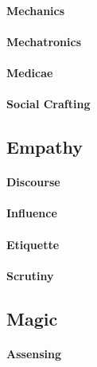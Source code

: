 \paragraph{Mechanics}

\paragraph{Mechatronics}

\paragraph{Medicae}

\paragraph{Social Crafting}


\subsection{Empathy}

\paragraph{Discourse}

\paragraph{Influence}

\paragraph{Etiquette}

\paragraph{Scrutiny}


\subsection{Magic}

\paragraph{Assensing}

